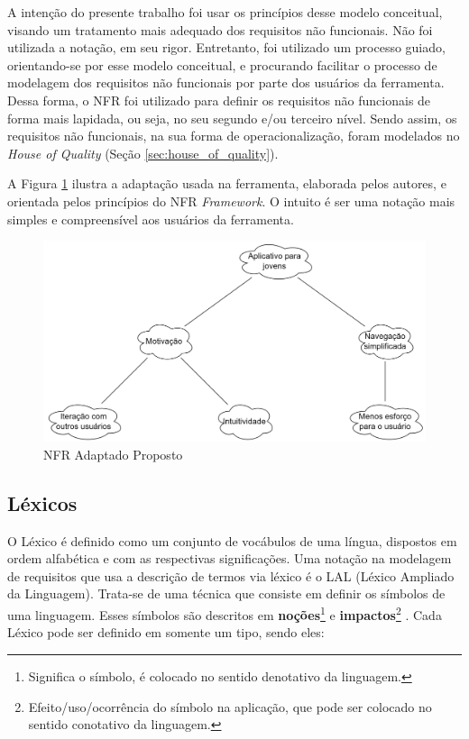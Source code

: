 A intenção do presente trabalho foi usar os princípios desse modelo conceitual, visando um tratamento mais adequado dos requisitos não funcionais. Não foi utilizada a notação, em seu rigor. Entretanto, foi utilizado um processo guiado, orientando-se por esse modelo conceitual, e procurando facilitar o processo de modelagem dos requisitos não funcionais por parte dos usuários da ferramenta. Dessa forma, o NFR foi utilizado para definir os requisitos não funcionais de forma mais lapidada, ou seja, no seu segundo e/ou terceiro nível. Sendo assim, os requisitos não funcionais, na sua forma de operacionalização, foram modelados no \textit{House of Quality} (Seção \ref{sec:house_of_quality}).

A Figura \ref{fig:nfr_example} ilustra a adaptação usada na ferramenta, elaborada pelos autores, e orientada pelos princípios do NFR \textit{Framework}. O intuito é ser uma notação mais simples e compreensível aos usuários da ferramenta.

\begin{figure}[H]
    \begin{center}
        \caption{NFR Adaptado Proposto}
        \label{fig:nfr_example}
        \includegraphics[scale=0.60]{figuras/Embasamento/nfr_adaptado.png}
    \end{center}
\end{figure}


\subsection{Léxicos}

\label{sec:lexicos}

O Léxico é definido como um conjunto de vocábulos de uma língua, dispostos em ordem alfabética e com as respectivas significações. Uma notação na modelagem de requisitos que usa a descrição de termos via léxico é o LAL (Léxico Ampliado da Linguagem). Trata-se de uma técnica que consiste em definir os símbolos de uma linguagem. Esses símbolos são descritos em \textbf{noções}\footnote{Significa o símbolo, é colocado no sentido denotativo da linguagem.} e \textbf{impactos}\footnote{Efeito/uso/ocorrência do símbolo na aplicação, que pode ser colocado no sentido conotativo da linguagem.} \cite{leite1993strategy}. Cada Léxico pode ser definido em somente um tipo, sendo eles:

